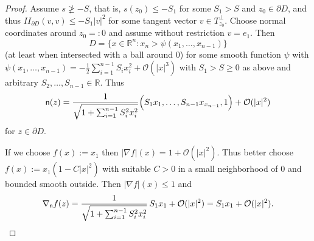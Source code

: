 \documentclass[a4paper,12pt]{article}
\theoremstyle{plain}
\def\R{{\mathbb R}}
\def\R{{\mathbb R}}%
\begin{document}
\begin{proof}
Assume $s\not\ge -S$, that is, $s(z_0)\le-S_1$ for some $S_1>S$ and $z_0\in\partial D$, and thus
${I\!\!I}_{\partial D}(v,v)\le -S_1 |v|^2$ for some tangent vector $v\in T_{z_0}^{\perp}$.
Choose normal coordinates around $z_0=:0$ and assume without restriction $v=e_1$. Then 
$$D=\{x\in\R^n: x_n>\psi(x_1,\ldots, x_{n-1})\}$$
(at least when intersected with a ball around $0$)
for some smooth function $\psi$
with
$\psi(x_1,\ldots, x_{n-1})=-\frac12 \sum_{i=1}^{n-1} S_ix_i^2 + \mathcal{O}(|x|^3)$ with $S_1>S\ge0$ as above and arbitrary $S_2,\ldots, S_{n-1}\in\R$.
Thus 
$${\sf n}(z)= \frac1{\sqrt{1+\sum_{i=1}^{n-1} S_i^2x_i^2}} \Big(S_1x_1, \ldots, S_{{n-1}}x_{x_{n-1}}, 1\Big)+ \mathcal{O}(|x|^2)$$
for $z\in\partial D$.

If we choose $f(x):=x_1$ then $|\nabla f|(x)=1+\mathcal O(|x|^2).$
Thus better choose $f(x):=x_1(1-C|x|^2)$ with suitable $C>0$ in a small neighborhood of 0 and bounded smooth outside. 
Then $|\nabla f|(x)\le1$
and
$$\nabla_{\sf n}f(z)= \frac1{\sqrt{1+\sum_{i=1}^{n-1} S_i^2x_i^2}} \, S_1x_1+\mathcal{O}(|x|^2)=S_1x_1+\mathcal{O}(|x|^2).$$


\end{proof}
\end{document}
